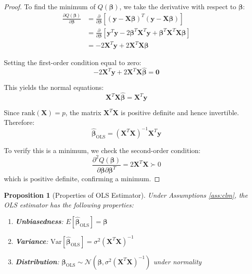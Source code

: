 \documentclass{article}
\newtheorem{proposition}{Proposition}
\begin{document}
\begin{proof}
To find the minimum of $Q(\boldsymbol{\beta})$, we take the derivative with respect to $\boldsymbol{\beta}$:
\begin{align}
\frac{\partial Q(\boldsymbol{\beta})}{\partial \boldsymbol{\beta}} &= \frac{\partial}{\partial \boldsymbol{\beta}}[(\mathbf{y} - \mathbf{X}\boldsymbol{\beta})^T(\mathbf{y} - \mathbf{X}\boldsymbol{\beta})] \\
&= \frac{\partial}{\partial \boldsymbol{\beta}}[\mathbf{y}^T\mathbf{y} - 2\boldsymbol{\beta}^T\mathbf{X}^T\mathbf{y} + \boldsymbol{\beta}^T\mathbf{X}^T\mathbf{X}\boldsymbol{\beta}] \\
&= -2\mathbf{X}^T\mathbf{y} + 2\mathbf{X}^T\mathbf{X}\boldsymbol{\beta}
\end{align}

Setting the first-order condition equal to zero:
\begin{equation}
-2\mathbf{X}^T\mathbf{y} + 2\mathbf{X}^T\mathbf{X}\hat{\boldsymbol{\beta}} = \mathbf{0}
\end{equation}

This yields the normal equations:
\begin{equation}
\mathbf{X}^T\mathbf{X}\hat{\boldsymbol{\beta}} = \mathbf{X}^T\mathbf{y}
\end{equation}

Since $\text{rank}(\mathbf{X}) = p$, the matrix $\mathbf{X}^T\mathbf{X}$ is positive definite and hence invertible. Therefore:
\begin{equation}
\hat{\boldsymbol{\beta}}_{\text{OLS}} = (\mathbf{X}^T\mathbf{X})^{-1}\mathbf{X}^T\mathbf{y}
\end{equation}

To verify this is a minimum, we check the second-order condition:
\begin{equation}
\frac{\partial^2 Q(\boldsymbol{\beta})}{\partial \boldsymbol{\beta} \partial \boldsymbol{\beta}^T} = 2\mathbf{X}^T\mathbf{X} \succ 0
\end{equation}
which is positive definite, confirming a minimum.
\end{proof}

\begin{proposition}[Properties of OLS Estimator]
Under Assumptions \ref{ass:clm}, the OLS estimator has the following properties:
\begin{enumerate}
    \item \textbf{Unbiasedness}: $E[\hat{\boldsymbol{\beta}}_{\text{OLS}}] = \boldsymbol{\beta}$
    \item \textbf{Variance}: $\text{Var}[\hat{\boldsymbol{\beta}}_{\text{OLS}}] = \sigma^2(\mathbf{X}^T\mathbf{X})^{-1}$
    \item \textbf{Distribution}: $\hat{\boldsymbol{\beta}}_{\text{OLS}} \sim \mathcal{N}(\boldsymbol{\beta}, \sigma^2(\mathbf{X}^T\mathbf{X})^{-1})$ under normality
\end{enumerate}
\end{proposition}
\end{document}
